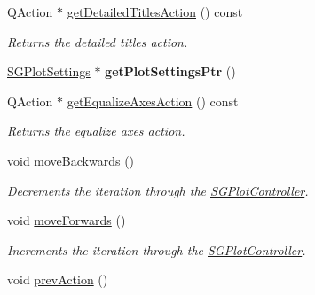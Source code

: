 \begin{DoxyCompactItemize}
Q\+Action $\ast$ \hyperlink{classSGSolutionHandler__V2_a808ac079b5e4fa60f90d8f2a74ee7606}{get\+Detailed\+Titles\+Action} () const
\begin{DoxyCompactList}\small\item\em Returns the detailed titles action. \end{DoxyCompactList}\item 
\mbox{\label{classSGSolutionHandler__V2_a68acd6f7ad49fb7634147074574a4318}} 
\hyperlink{classSGPlotSettings}{S\+G\+Plot\+Settings} $\ast$ {\bfseries get\+Plot\+Settings\+Ptr} ()
\item 
\mbox{\label{classSGSolutionHandler__V2_a6e0f82d327c361920d0c98f24847f84a}} 
Q\+Action $\ast$ \hyperlink{classSGSolutionHandler__V2_a6e0f82d327c361920d0c98f24847f84a}{get\+Equalize\+Axes\+Action} () const
\begin{DoxyCompactList}\small\item\em Returns the equalize axes action. \end{DoxyCompactList}\item 
\mbox{\label{classSGSolutionHandler__V2_a9f611eaa5fb5a8b4ee0888e3a1d57524}} 
void \hyperlink{classSGSolutionHandler__V2_a9f611eaa5fb5a8b4ee0888e3a1d57524}{move\+Backwards} ()
\begin{DoxyCompactList}\small\item\em Decrements the iteration through the \hyperlink{classSGPlotController}{S\+G\+Plot\+Controller}. \end{DoxyCompactList}\item 
\mbox{\label{classSGSolutionHandler__V2_ad9266c0db513092e4510ff6603f80956}} 
void \hyperlink{classSGSolutionHandler__V2_ad9266c0db513092e4510ff6603f80956}{move\+Forwards} ()
\begin{DoxyCompactList}\small\item\em Increments the iteration through the \hyperlink{classSGPlotController}{S\+G\+Plot\+Controller}. \end{DoxyCompactList}\item 
\mbox{\label{classSGSolutionHandler__V2_a37ac2896fd077e15145d3b537982fb29}} 
void \hyperlink{classSGSolutionHandler__V2_a37ac2896fd077e15145d3b537982fb29}{prev\+Action} ()

\end{DoxyCompactItemize}
